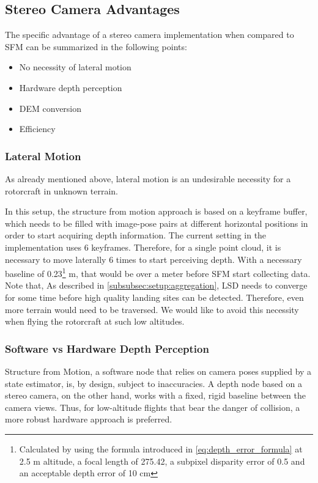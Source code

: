 \subsection{Stereo Camera Advantages}

The specific advantage of a stereo camera implementation when compared to SFM can be summarized in the following points:

\begin{itemize}
    \item No necessity of lateral motion
    \item Hardware depth perception
    \item DEM conversion
    \item Efficiency
\end{itemize}

\subsubsection{Lateral Motion}

As already mentioned above, lateral motion is an undesirable necessity for a rotorcraft in unknown terrain. 

In this setup, the structure from motion approach is based on a keyframe buffer, which needs to be filled with image-pose pairs at different horizontal positions in order to start acquiring depth information. The current setting in the implementation \citet{SFM} uses 6 keyframes. Therefore, for a single point cloud, it is necessary to move laterally 6 times to start perceiving depth. With a necessary baseline of 0.23\footnote[2]{Calculated by using the formula introduced in \cref{eq:depth_error_formula} at 2.5 m altitude, a focal length of 275.42, a subpixel disparity error of 0.5 and an acceptable depth error of 10 cm} m, that would be over a meter before SFM start collecting data. Note that, As described in \cref{subsubsec:setup:aggregation}, LSD needs to converge for some time before high quality landing sites can be detected. Therefore, even more terrain would need to be traversed. We would like to avoid this necessity when flying the rotorcraft at such low altitudes.

\subsubsection{Software vs Hardware Depth Perception}

Structure from Motion, a software node that relies on camera poses supplied by a state estimator, is, by design, subject to inaccuracies. A depth node based on a stereo camera, on the other hand, works with a fixed, rigid baseline between the camera views. Thus, for low-altitude flights that bear the danger of collision, a more robust hardware approach is preferred.

